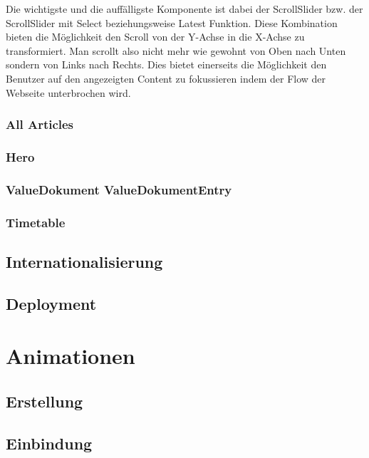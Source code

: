 Die wichtigste und die auffälligste Komponente ist dabei der ScrollSlider bzw. der ScrollSlider mit Select beziehungsweise Latest Funktion. 
Diese Kombination bieten die Möglichkeit den Scroll von der Y-Achse in die X-Achse zu transformiert. Man scrollt also nicht mehr wie gewohnt von Oben nach Unten sondern von Links nach Rechts. Dies bietet einerseits die Möglichkeit den Benutzer auf den angezeigten Content zu fokussieren indem der Flow der Webseite unterbrochen wird. 

\subsubsection*{All Articles}

\subsubsection*{Hero}

\subsubsection*{ValueDokument ValueDokumentEntry}

\subsubsection*{Timetable}

\subsection{Internationalisierung}

\subsection{Deployment}

\section{Animationen}

\subsection{Erstellung}

\subsection{Einbindung}


